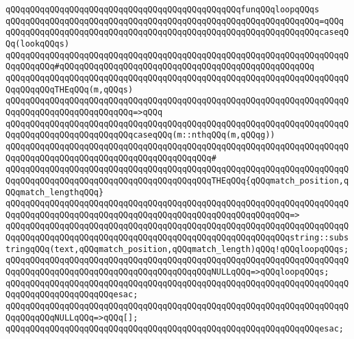 \newline
\verb|qQQqqQQqqQQqqQQqqQQqqQQqqQQqqQQqqQQqqQQqqQQqqQQqfunqQQqloopqQQqs|\newline
\verb|qQQqqQQqqQQqqQQqqQQqqQQqqQQqqQQqqQQqqQQqqQQqqQQqqQQqqQQqqQQqqQQq=qQQq|\newline
\verb|qQQqqQQqqQQqqQQqqQQqqQQqqQQqqQQqqQQqqQQqqQQqqQQqqQQqqQQqqQQqqQQqcaseqQQq(lookqQQqs)|\newline
\verb|qQQqqQQqqQQqqQQqqQQqqQQqqQQqqQQqqQQqqQQqqQQqqQQqqQQqqQQqqQQqqQQqqQQqqQQqqQQqqQQq#qQQqqQQqqQQqqQQqqQQqqQQqqQQqqQQqqQQqqQQqqQQqqQQqqQQq|\newline
\verb|qQQqqQQqqQQqqQQqqQQqqQQqqQQqqQQqqQQqqQQqqQQqqQQqqQQqqQQqqQQqqQQqqQQqqQQqqQQqqQQqTHEqQQq(m,qQQqs)|\newline
\verb|qQQqqQQqqQQqqQQqqQQqqQQqqQQqqQQqqQQqqQQqqQQqqQQqqQQqqQQqqQQqqQQqqQQqqQQqqQQqqQQqqQQqqQQqqQQqqQQq=>qQQq|\newline
\verb|qQQqqQQqqQQqqQQqqQQqqQQqqQQqqQQqqQQqqQQqqQQqqQQqqQQqqQQqqQQqqQQqqQQqqQQqqQQqqQQqqQQqqQQqqQQqqQQqcaseqQQq(m::nthqQQq(m,qQQqg))|\newline
\verb|qQQqqQQqqQQqqQQqqQQqqQQqqQQqqQQqqQQqqQQqqQQqqQQqqQQqqQQqqQQqqQQqqQQqqQQqqQQqqQQqqQQqqQQqqQQqqQQqqQQqqQQqqQQqqQQq#|\newline
\verb|qQQqqQQqqQQqqQQqqQQqqQQqqQQqqQQqqQQqqQQqqQQqqQQqqQQqqQQqqQQqqQQqqQQqqQQqqQQqqQQqqQQqqQQqqQQqqQQqqQQqqQQqqQQqqQQqTHEqQQq{qQQqmatch_position,qQQqmatch_lengthqQQq}|\newline
\verb|qQQqqQQqqQQqqQQqqQQqqQQqqQQqqQQqqQQqqQQqqQQqqQQqqQQqqQQqqQQqqQQqqQQqqQQqqQQqqQQqqQQqqQQqqQQqqQQqqQQqqQQqqQQqqQQqqQQqqQQqqQQqqQQq=>|\newline
\verb|qQQqqQQqqQQqqQQqqQQqqQQqqQQqqQQqqQQqqQQqqQQqqQQqqQQqqQQqqQQqqQQqqQQqqQQqqQQqqQQqqQQqqQQqqQQqqQQqqQQqqQQqqQQqqQQqqQQqqQQqqQQqqQQqstring::substringqQQq(text,qQQqmatch_position,qQQqmatch_length)qQQq!qQQqloopqQQqs;|\newline
\newline
\verb|qQQqqQQqqQQqqQQqqQQqqQQqqQQqqQQqqQQqqQQqqQQqqQQqqQQqqQQqqQQqqQQqqQQqqQQqqQQqqQQqqQQqqQQqqQQqqQQqqQQqqQQqqQQqqQQqNULLqQQq=>qQQqloopqQQqs;|\newline
\verb|qQQqqQQqqQQqqQQqqQQqqQQqqQQqqQQqqQQqqQQqqQQqqQQqqQQqqQQqqQQqqQQqqQQqqQQqqQQqqQQqqQQqqQQqqQQqesac;|\newline
\newline
\verb|qQQqqQQqqQQqqQQqqQQqqQQqqQQqqQQqqQQqqQQqqQQqqQQqqQQqqQQqqQQqqQQqqQQqqQQqqQQqqQQqNULLqQQq=>qQQq[];|\newline
\verb|qQQqqQQqqQQqqQQqqQQqqQQqqQQqqQQqqQQqqQQqqQQqqQQqqQQqqQQqqQQqqQQqesac;|\newline
